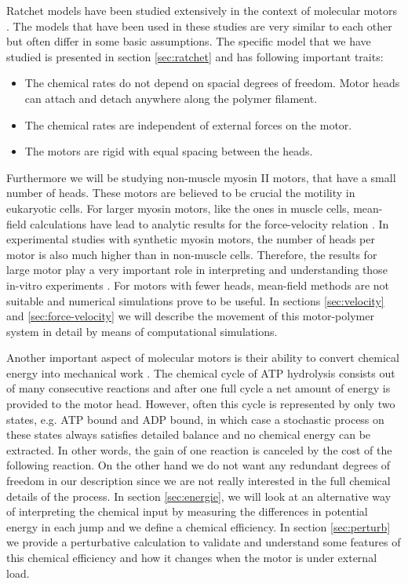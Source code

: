 \documentclass[aps,pre,twocolumn,showpacs,showkeys]{revtex4-1}
\begin{document}
Ratchet models have been studied extensively in the context of molecular motors \cite{reimann2002brownian,astumian1994fluctuation,astumian1996mechanochemical,julicher1997modeling,Reimann2002introduction,julicher1997spontaneous,peskin1995correlation,huxley1969mechanism,huxley1971proposed}.
The models that have been used in these studies are very similar to each other but often differ in some basic assumptions.
The specific model that we have studied is presented in section \ref{sec:ratchet} and has following important traits:
\begin{itemize}
\item The chemical rates do not depend on spacial degrees of freedom. 
Motor heads can attach and detach anywhere along the polymer filament.
\item The chemical rates are independent of external forces on the motor.
\item The motors are rigid with equal spacing between the heads.
\end{itemize} 
Furthermore we will be studying non-muscle myosin II motors, that have a small number of heads. 
These motors are believed to be crucial the motility in eukaryotic cells.%
For larger myosin motors, like the ones in muscle cells, mean-field calculations have lead to analytic results for the force-velocity relation \cite{julicher1997modeling}.
In experimental studies with synthetic myosin motors, the number of heads per motor is also much higher than in non-muscle cells. 
Therefore, the results for large motor play a very important role in interpreting and understanding those in-vitro experiments \cite{brown2009cross-correlated}.
For motors with fewer heads, mean-field methods are not suitable and numerical simulations prove to be useful.
In sections \ref{sec:velocity} and \ref{sec:force-velocity} we will describe the movement of this motor-polymer system in detail by means of computational simulations.


Another important aspect of molecular motors is their ability to convert chemical energy into mechanical work \cite{astumian1996mechanochemical}.
The chemical cycle of ATP hydrolysis consists out of many consecutive reactions and after one full cycle a net amount of energy is provided to the motor head.
However, often this cycle is represented by only two states, e.g. ATP bound and ADP bound, 
in which case a stochastic process on these states always satisfies detailed balance and no chemical energy can be extracted. 
In other words, the gain of one reaction is canceled by the cost of the following reaction.
On the other hand we do not want any redundant degrees of freedom in our description since we are not really interested in the full chemical details of the process.
In section \ref{sec:energie}, we will look at an alternative way of interpreting the chemical input by measuring the differences in potential energy in each jump and we define a chemical efficiency.
In section \ref{sec:perturb} we provide a perturbative calculation to validate and understand some features of this chemical efficiency and how it changes when the motor is under external load.
\end{document}
